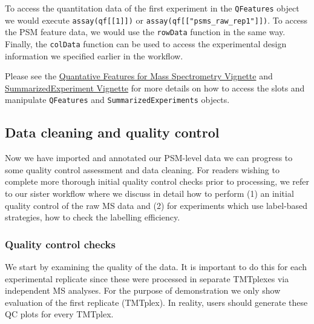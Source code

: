 \documentclass[9pt,a4paper,]{extarticle}
\begin{document}
To access the quantitation data of the first experiment in the \texttt{QFeatures}
object we would execute \texttt{assay(qf{[}{[}1{]}{]})} or \texttt{assay(qf{[}{[}"psms\_raw\_rep1"{]}{]})}.
To access the PSM feature data, we would use the \texttt{rowData} function in the same
way. Finally, the \texttt{colData} function can be used to access the experimental
design information we specified earlier in the workflow.

Please see the \href{https://bioconductor.org/packages/release/bioc/vignettes/QFeatures/inst/doc/QFeatures.html}{Quantative Features for Mass Spectrometry Vignette}
and \href{https://bioconductor.org/packages/release/bioc/vignettes/SummarizedExperiment/inst/doc/SummarizedExperiment.html}{SummarizedExperiment Vignette}
for more details on how to access the slots and manipulate \texttt{QFeatures} and
\texttt{SummarizedExperiments} objects.

\subsection{Data cleaning and quality control}\label{data-cleaning-and-quality-control}

Now we have imported and annotated our PSM-level data we can progress to some
quality control assessment and data cleaning. For readers wishing to complete
more thorough initial quality control checks prior to processing, we refer to our
sister workflow \citep{Hutchings2023} where we discuss in detail how to perform (1)
an initial quality control of the raw MS data and (2) for experiments which use
label-based strategies, how to check the labelling efficiency.

\subsubsection{Quality control checks}\label{quality-control-checks}

We start by examining the quality of the data. It is important to do this for
each experimental replicate since these were processed in separate TMTplexes via
independent MS analyses. For the purpose of demonstration we only show
evaluation of the first replicate (TMTplex). In reality, users should generate
these QC plots for every TMTplex.
\end{document}

